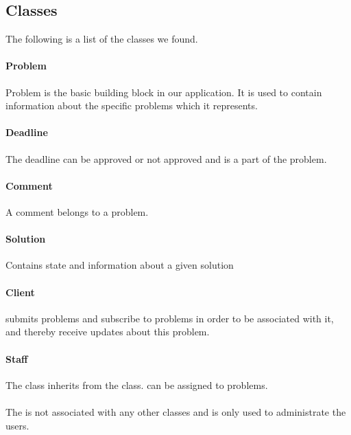 \subsection{Classes}
\label{}
The following is a list of the classes we found.

\paragraph{Problem}
Problem is the basic building block in our application. It is used to contain information about the specific problems which it represents.

\paragraph{Deadline} The deadline can be approved or not approved and is a part of the problem. 

\paragraph{Comment} A comment belongs to a problem. 

\paragraph{Solution}
Contains state and information about a given solution


\paragraph{Client} \aclient[] submits problems and subscribe to problems in order to be associated with it, and thereby receive updates about this problem.
 
\paragraph{Staff}
The \astaff[] class inherits from the \aclient[] class.
\astaff[] can be assigned to problems. 

\paragraph{\Admin[]} The \admin[] is not associated with any other classes and is only used to administrate the users. 

